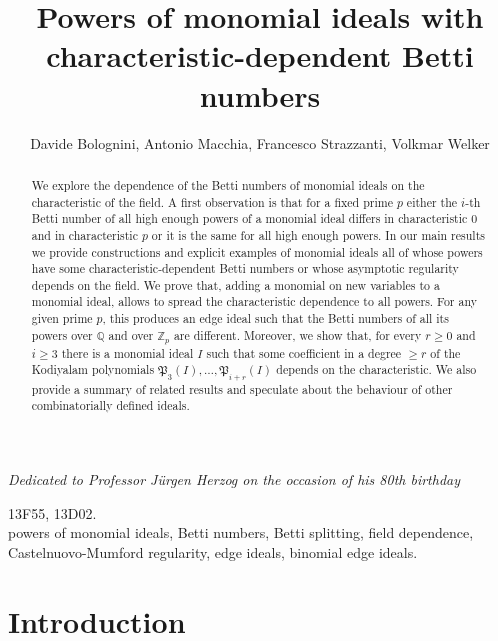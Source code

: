 \documentclass[11pt,oneside]{amsart}
\date{}
\title{Powers of monomial ideals with characteristic-dependent Betti numbers}
\author[D. Bolognini, A. Macchia, F. Strazzanti, V. Welker]{Davide Bolognini, Antonio Macchia, Francesco Strazzanti, Volkmar Welker}
\theoremstyle{plain}
\theoremstyle{definition}
\newcommand{\Q}{\mathbb{Q}}
\newcommand{\Z}{\mathbb{Z}}
\begin{document}
\maketitle

\begin{center} 
\textit{Dedicated to Professor J\"urgen Herzog on the occasion of his 80th birthday}
\end{center}


\begin{abstract}
We explore the dependence of the Betti numbers of monomial ideals on the characteristic of the field. A first observation is that for a fixed prime $p$ either the $i$-th Betti number of all high enough powers of a monomial ideal differs in characteristic $0$ and in characteristic $p$ or it is the same for all high enough powers.  
In our main results we provide constructions and explicit examples of monomial ideals all of whose powers have some characteristic-dependent Betti numbers or whose asymptotic regularity depends on the field. We prove that, adding a monomial on new variables to a monomial ideal, allows to spread the characteristic dependence to all powers. For any given prime $p$, this produces an edge ideal such that the Betti numbers of all its powers over $\Q$ and over $\Z_p$ are different. Moreover, we show that, for every $r \geq 0$ and $i \geq 3$ there is a monomial ideal $I$ such that some coefficient in a degree $\geq r$ of the Kodiyalam polynomials $\mathfrak P_3(I),\ldots,\mathfrak P_{i+r}(I)$ depends on the characteristic. We also provide a summary of related results and speculate about the behaviour of other combinatorially defined ideals.
\end{abstract}

\bigskip

 13F55, 13D02. \\
 powers of monomial ideals, Betti numbers, Betti splitting, field dependence, Castelnuovo-Mumford regularity, edge ideals, binomial edge ideals.


\section{Introduction}
\end{document}
